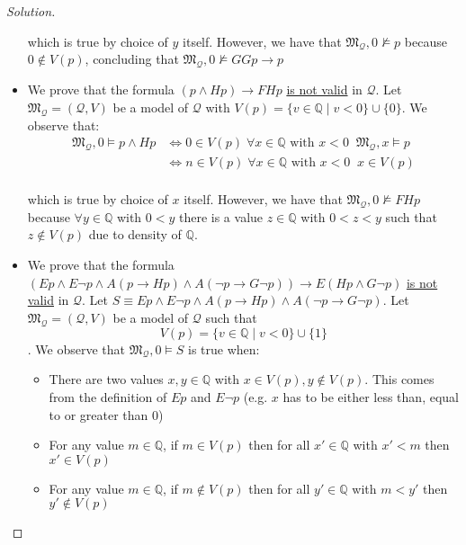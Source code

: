 \documentclass[12pt,a4paper]{report}
\theoremstyle{definition}
\newcommand{\Q}{\mathbb{Q}}                     %
\newcommand{\model}[1]{\mathfrak{#1}}           %
\begin{document}
\begin{proof}[Solution]
\begin{itemize}
            which is true by choice of $y$ itself. However, we have that $\model{M}_{\mathcal{Q}}, 0 \not\models p$ because $0 \notin V(p)$, concluding that $\model{M}_{\mathcal{Q}}, 0 \not\models GGp \to p$

            \item We prove that the formula $(p \land Hp) \to FHp$ \underline{is not valid} in $\mathcal{Q}$. Let $\model{M}_{\mathcal{Q}} = (\mathcal{Q}, V)$ be a model of $\mathcal{Q}$ with $V(p) = \{v \in \Q \mid v < 0\} \cup \{0\}$. We observe that:
            \[\begin{split}
                \model{M}_{\mathcal{Q}}, 0 \models p \land Hp & \iff 0 \in V(p) \; \forall x \in \Q \text{ with } x < 0 \;\; \model{M}_{\mathcal{Q}}, x \models p \\
                & \iff n \in V(p) \; \forall x \in \Q \text{ with } x < 0 \;\; x \in V(p) \\
            \end{split}\]
            
            which is true by choice of $x$ itself. However, we have that $\model{M}_{\mathcal{Q}}, 0 \not\models FHp$ because $\forall y \in \Q$ with $0 < y$ there is a value $z \in \Q$ with $0 < z < y$ such that $z \notin V(p)$ due to density of $\Q$.

            \item We prove that the formula $(Ep \land E \lnot p \land A(p \to Hp) \land A(\lnot p \to G \lnot p)) \to E(Hp \land G \lnot p)$ \underline{is not valid} in $\mathcal{Q}$. Let $S \equiv Ep \land E \lnot p \land A(p \to Hp) \land A(\lnot p \to G \lnot p)$. Let $\model{M}_{\mathcal{Q}} = (\mathcal{Q}, V)$ be a model of $\mathcal{Q}$ such that
            \[V(p) = \{v \in \Q \mid v < 0\} \cup \{1\}\]. We observe that $\model{M}_{\mathcal{Q}}, 0 \models S$ is true when:
            \begin{itemize}
                \item There are two values $x,y \in \Q$ with $x \in V(p), y \notin V(p)$. This comes from the definition of $E p$ and $E \lnot p$ (e.g. $x$ has to be either less than, equal to or greater than $0$)
                \item For any value $m \in \Q$, if $m \in V(p)$ then for all $x' \in \Q$ with $x' < m$ then $x' \in V(p)$
                \item For any value $m \in \Q$, if $m \notin V(p)$ then for all $y' \in \Q$ with $m < y'$ then $y' \notin V(p)$
            \end{itemize}


\end{itemize}
\end{proof}
\end{document}
